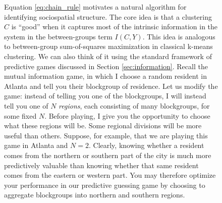 \documentclass[english]{scrartcl}
\begin{document}
\begin{figure}
	Equation \eqref{eq:chain_rule} motivates a natural algorithm for identifying sociospatial structure. The core idea is that a clustering $C$ is ``good'' when it captures most of the intrinsic information in the system in the between-groups term $I(C,Y)$. This idea is analogous to between-group sum-of-squares maximization in classical k-means clustering. We can also think of it using the standard framework of predictive games discussed in Section \ref{sec:information}. Recall the mutual information game, in which I choose a random resident in Atlanta and tell you their blockgroup of residence. Let us modify the game: instead of telling you one of the blockgroups, I will instead tell you one of $N$ \emph{regions}, each consisting of many blockgroups, for some fixed $N$. Before playing, I give you the opportunity to choose what these regions will be. Some regional divisions will be more useful than others. Suppose, for example, that we are playing this game in Atlanta and $N = 2$. Clearly, knowing whether a resident comes from the northern or southern part of the city is much more predictively valuable than knowing whether that same resident comes from the eastern or western part. You may therefore optimize your performance in our predictive guessing game by choosing to aggregate blockgroups into northern and southern regions. 


\end{figure}
\end{document}
